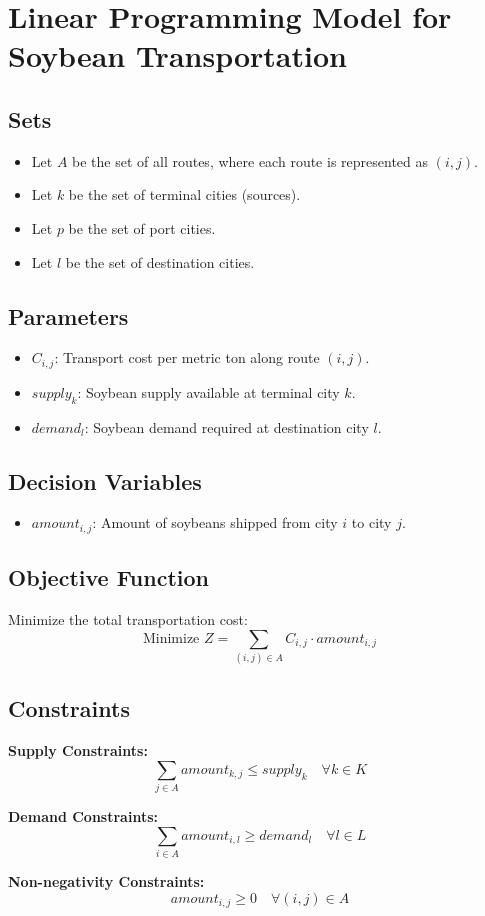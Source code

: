 \documentclass{article}
\begin{document}
\section*{Linear Programming Model for Soybean Transportation}

\subsection*{Sets}
\begin{itemize}
    \item Let \( A \) be the set of all routes, where each route is represented as \( (i, j) \).
    \item Let \( k \) be the set of terminal cities (sources).
    \item Let \( p \) be the set of port cities.
    \item Let \( l \) be the set of destination cities.
\end{itemize}

\subsection*{Parameters}
\begin{itemize}
    \item \( C_{i,j} \): Transport cost per metric ton along route \( (i,j) \).
    \item \( supply_k \): Soybean supply available at terminal city \( k \).
    \item \( demand_l \): Soybean demand required at destination city \( l \).
\end{itemize}

\subsection*{Decision Variables}
\begin{itemize}
    \item \( amount_{i,j} \): Amount of soybeans shipped from city \( i \) to city \( j \).
\end{itemize}

\subsection*{Objective Function}
Minimize the total transportation cost:
\[
\text{Minimize } Z = \sum_{(i,j) \in A} C_{i,j} \cdot amount_{i,j}
\]

\subsection*{Constraints}

\textbf{Supply Constraints:}
\[
\sum_{j \in A} amount_{k,j} \leq supply_k \quad \forall k \in K
\]

\textbf{Demand Constraints:}
\[
\sum_{i \in A} amount_{i,l} \geq demand_l \quad \forall l \in L
\]

\textbf{Non-negativity Constraints:}
\[
amount_{i,j} \geq 0 \quad \forall (i,j) \in A
\]
\end{document}
